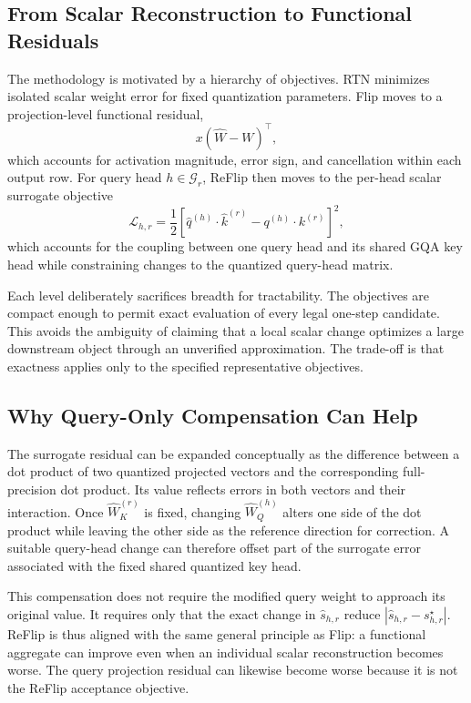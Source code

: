 \subsection{From Scalar Reconstruction to Functional Residuals}

The methodology is motivated by a hierarchy of objectives. RTN minimizes isolated scalar weight error for fixed quantization parameters. Flip moves to a projection-level functional residual,
\begin{equation}
x(\hat W-W)^\top,
\end{equation}
which accounts for activation magnitude, error sign, and cancellation within each output row. For query head $h\in\mathcal{G}_r$, ReFlip then moves to the per-head scalar surrogate objective
\begin{equation}
\mathcal{L}_{h,r}
=
\frac{1}{2}
\left[
\hat q^{(h)}\cdot\hat k^{(r)}
-
q^{(h)}\cdot k^{(r)}
\right]^2,
\end{equation}
which accounts for the coupling between one query head and its shared GQA key head while constraining changes to the quantized query-head matrix.

Each level deliberately sacrifices breadth for tractability. The objectives are compact enough to permit exact evaluation of every legal one-step candidate. This avoids the ambiguity of claiming that a local scalar change optimizes a large downstream object through an unverified approximation. The trade-off is that exactness applies only to the specified representative objectives.

\subsection{Why Query-Only Compensation Can Help}

The surrogate residual can be expanded conceptually as the difference between a dot product of two quantized projected vectors and the corresponding full-precision dot product. Its value reflects errors in both vectors and their interaction. Once $\hat W_K^{(r)}$ is fixed, changing $\hat W_Q^{(h)}$ alters one side of the dot product while leaving the other side as the reference direction for correction. A suitable query-head change can therefore offset part of the surrogate error associated with the fixed shared quantized key head.

This compensation does not require the modified query weight to approach its original value. It requires only that the exact change in $\hat{s}_{h,r}$ reduce $|\hat{s}_{h,r}-s_{h,r}^\star|$. ReFlip is thus aligned with the same general principle as Flip: a functional aggregate can improve even when an individual scalar reconstruction becomes worse. The query projection residual can likewise become worse because it is not the ReFlip acceptance objective.

